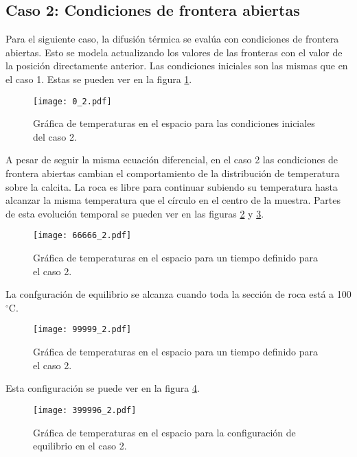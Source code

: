 \documentclass[10pt, twocolumn]{article}
\begin{document}
\subsection{Caso 2: Condiciones de frontera abiertas}
Para el siguiente caso, la difusión térmica se evalúa con condiciones de frontera abiertas. Esto se modela actualizando los valores de las fronteras con el valor de la posición directamente anterior. Las condiciones iniciales son las mismas que en el caso 1. Estas se pueden ver en la figura \ref{c2_ini}.
\begin{figure}[h]
\centering
\texttt{[image: 0\_2.pdf]}
\caption{Gráfica de temperaturas en el espacio para las condiciones iniciales del caso 2.}
\label{c2_ini}
\end{figure}
A pesar de seguir la misma ecuación diferencial, en el caso 2 las condiciones de frontera abiertas cambian el comportamiento de la distribución de temperatura sobre la calcita. La roca es libre para continuar subiendo su temperatura hasta alcanzar la misma temperatura que el círculo en el centro de la muestra. Partes de esta evolución temporal se pueden ver en las figuras \ref{c2_g1} y \ref{c2_g2}.
\begin{figure}[htbp]
\centering
\texttt{[image: 66666\_2.pdf]}
\caption{Gráfica de temperaturas en el espacio para un tiempo definido para el caso 2.}
\label{c2_g1}
\end{figure}
La confguración de equilibrio se alcanza cuando toda la sección de roca está a 100 $^\circ$C.
\begin{figure}[htbp]
\centering
\texttt{[image: 99999\_2.pdf]}
\caption{Gráfica de temperaturas en el espacio para un tiempo definido para el caso 2.}
\label{c2_g2}
\end{figure}
Esta configuración se puede ver en la figura \ref{c2_equi}.
\begin{figure}[h]
\centering
\texttt{[image: 399996\_2.pdf]}
\caption{Gráfica de temperaturas en el espacio para la configuración de equilibrio en el caso 2.}
\label{c2_equi}
\end{figure}
\end{document}
